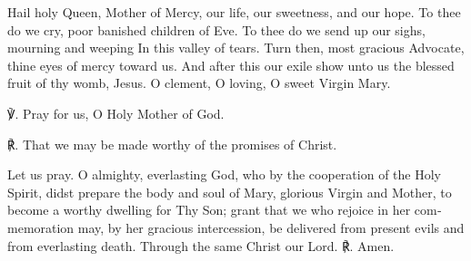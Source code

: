\begin{otherlanguage}{english}\noindent Hail holy Queen, Mother of Mercy, 
our life, our sweetness, and our hope. 
To thee do we cry, poor banished children of Eve. 
To thee do we send up our sighs, mourning and weeping 
In this valley of tears. Turn then, most gracious Advocate, 
thine eyes of mercy toward us. 
And after this our exile show unto us 
the blessed fruit of thy womb, Jesus.
O clement, O loving, O sweet Virgin Mary.

\noindent ℣. Pray for us, O Holy Mother of God.

\noindent ℟. \hspace{-0.02em}That we may be made worthy of the promises of Christ.

\noindent Let us pray. O almighty, everlasting God, who by the cooperation of the Holy Spirit, didst prepare the body and soul of Mary, glorious Virgin and Mother, to become a worthy dwelling for Thy Son; grant that we who rejoice in her commemoration may, by her gracious intercession, be delivered from present evils and from everlasting death. Through the same Christ our Lord. ℟. Amen.
\end{otherlanguage}